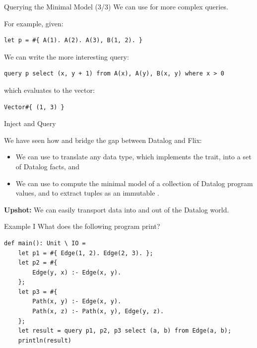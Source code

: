 \begin{frame}[fragile]{Querying the Minimal Model (3/3)}
We can use  for more complex queries.

For example, given: 

\begin{lstlisting}[language=flix, xleftmargin=0.8cm]
let p = #{ A(1). A(2). A(3), B(1, 2). }
\end{lstlisting}

We can write the more interesting query:

\begin{lstlisting}[language=flix, xleftmargin=0.8cm]
query p select (x, y + 1) from A(x), A(y), B(x, y) where x > 0 
\end{lstlisting}

which evaluates to the vector:

\begin{lstlisting}[language=flix, xleftmargin=0.8cm]
Vector#{ (1, 3) }
\end{lstlisting}
\end{frame}

\begin{frame}[fragile]{Inject and Query}

We have seen how  and  bridge the gap between Datalog
and Flix:

\begin{itemize}
    \item We can use  to translate any data type, which implements
    the  trait, into a set of Datalog facts, and 
    \item We can use  to compute the minimal model of a collection
    of Datalog program values, and to extract tuples as an immutable
    .
\end{itemize}

\textbf{Upshot:} We can easily transport data into and out of the Datalog world.
\end{frame}

\begin{frame}[fragile]{Example I}
What does the following program print?

\begin{lstlisting}[language=flix, xleftmargin=0.8cm]
def main(): Unit \ IO = 
    let p1 = #{ Edge(1, 2). Edge(2, 3). };
    let p2 = #{ 
        Edge(y, x) :- Edge(x, y). 
    };
    let p3 = #{ 
        Path(x, y) :- Edge(x, y).
        Path(x, z) :- Path(x, y), Edge(y, z).
    };
    let result = query p1, p2, p3 select (a, b) from Edge(a, b);
    println(result)
\end{lstlisting}
\end{frame}

